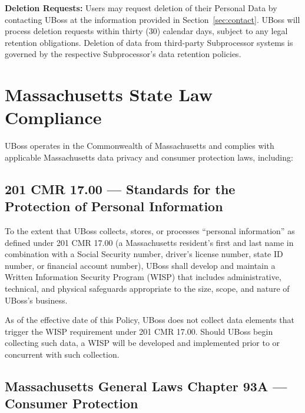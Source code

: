 \documentclass[11pt, letterpaper]{article}
\begin{document}
\textbf{Deletion Requests:} Users may request deletion of their Personal Data by
contacting UBoss at the information provided in Section~\ref{sec:contact}. UBoss will
process deletion requests within thirty (30) calendar days, subject to any legal
retention obligations. Deletion of data from third-party Subprocessor systems is
governed by the respective Subprocessor's data retention policies.



\section{Massachusetts State Law Compliance}

UBoss operates in the Commonwealth of Massachusetts and complies with applicable
Massachusetts data privacy and consumer protection laws, including:

\subsection{201 CMR 17.00 --- Standards for the Protection of Personal Information}

To the extent that UBoss collects, stores, or processes ``personal information'' as
defined under 201 CMR 17.00 (a Massachusetts resident's first and last name in
combination with a Social Security number, driver's license number, state ID number,
or financial account number), UBoss shall develop and maintain a Written Information
Security Program (WISP) that includes administrative, technical, and physical
safeguards appropriate to the size, scope, and nature of UBoss's business.

As of the effective date of this Policy, UBoss does not collect data elements that
trigger the WISP requirement under 201 CMR 17.00. Should UBoss begin collecting such
data, a WISP will be developed and implemented prior to or concurrent with such
collection.

\subsection{Massachusetts General Laws Chapter 93A --- Consumer Protection}
\end{document}
